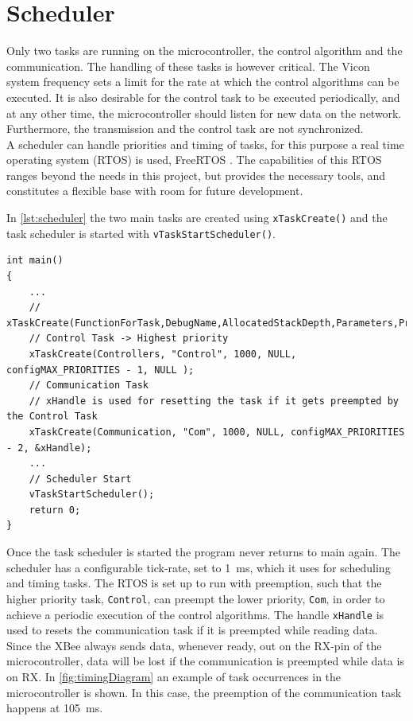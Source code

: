 \section{Scheduler}\label{sec:Scheduler}
Only two tasks are running on the microcontroller, the control algorithm and the communication. The handling of these tasks is however critical. The Vicon system frequency sets a limit for the rate at which the control algorithms can be executed. It is also desirable for the control task to be executed periodically, and at any other time, the microcontroller should listen for new data on the network. Furthermore, the transmission and the control task are not synchronized.
\\
A scheduler can handle priorities and timing of tasks, for this purpose a real time operating system (RTOS) is used, FreeRTOS \cite{freeRtos}. The capabilities of this RTOS ranges beyond the needs in this project, but provides the necessary tools, and constitutes a flexible base with room for future development.

In \autoref{lst:scheduler} the two main tasks are created using \lstinline[style=customcppinline]{xTaskCreate()} and the task scheduler is started with \lstinline[style=customcppinline]{vTaskStartScheduler()}.
\vspace{-0.5 cm}
\begin{lstlisting}[style=customcpp,
                    caption={Code for initialization, creation of the different tasks, start sequence for the motors and call to the scheduler.}, 
                    label=lst:scheduler]
int main()
{
    ... 
  	// xTaskCreate(FunctionForTask,DebugName,AllocatedStackDepth,Parameters,Priority,TaskHandle)
    // Control Task -> Highest priority
    xTaskCreate(Controllers, "Control", 1000, NULL, configMAX_PRIORITIES - 1, NULL );
    // Communication Task 
    // xHandle is used for resetting the task if it gets preempted by the Control Task
    xTaskCreate(Communication, "Com", 1000, NULL, configMAX_PRIORITIES - 2, &xHandle);
    ...
    // Scheduler Start 
    vTaskStartScheduler();
    return 0;
}
\end{lstlisting}
\vspace{-0.5 cm}
Once the task scheduler is started the program never returns to main again. The scheduler has a configurable tick-rate, set to \SI{1}{ms}, which it uses for scheduling and timing tasks. The RTOS is set up to run with preemption, such that the higher priority task, \lstinline[style=customcppinline]{Control}, can preempt the lower priority, \lstinline[style=customcppinline]{Com}, in order to achieve a periodic execution of the control algorithms. The handle \lstinline[style=customcppinline]{xHandle} is used to resets the communication task if it is preempted while reading data. Since the XBee always sends data, whenever ready, out on the RX-pin of the microcontroller, data will be lost if the communication is preempted while data is on RX. In \autoref{fig:timingDiagram} an example of task occurrences in the microcontroller is shown. In this case, the preemption of the communication task happens at \SI{105}{ms}.

